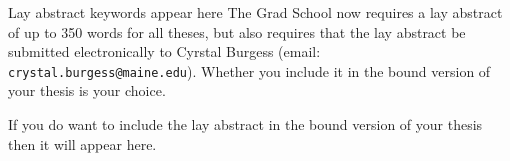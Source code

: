 {}

\begin{abstract}
The abstract for you thesis will appear on this page.  It should be limited to 350 words for a Ph.D thesis or 500 words for a Master's thesis.
\end{abstract}

\begin{layabstract}{Lay abstract keywords appear here}
The Grad School now requires a lay abstract of up to 350 words for all theses, but also requires that the lay abstract be submitted electronically to Cyrstal Burgess (email: \verb=crystal.burgess@maine.edu=).  Whether you include it in the bound version of your thesis is your choice.

If you do want to include the lay abstract in the bound version of your thesis then it will appear here.
\end{layabstract}

